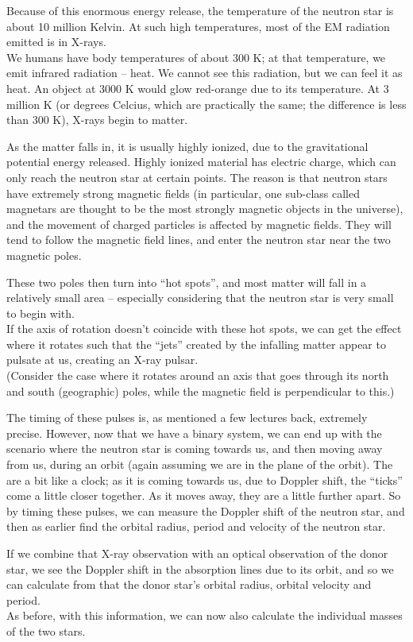 \documentclass[8.01x]{subfiles}
\begin{document}
Because of this enormous energy release, the temperature of the neutron star is about 10 million Kelvin. At such high temperatures, most of the EM radiation emitted is in X-rays.\\
We humans have body temperatures of about 300 K; at that temperature, we emit infrared radiation -- heat. We cannot see this radiation, but we can feel it as heat. An object at 3000 K would glow red-orange due to its temperature. At 3 million K (or degrees Celcius, which are practically the same; the difference is less than 300 K), X-rays begin to matter.

As the matter falls in, it is usually highly ionized, due to the gravitational potential energy released. Highly ionized material has electric charge, which can only reach the neutron star at certain points. The reason is that neutron stars have extremely strong magnetic fields (in particular, one sub-class called magnetars are thought to be the most strongly magnetic objects in the universe), and the movement of charged particles is affected by magnetic fields. They will tend to follow the magnetic field lines, and enter the neutron star near the two magnetic poles.

These two poles then turn into ``hot spots'', and most matter will fall in a relatively small area -- especially considering that the neutron star is very small to begin with.\\
If the axis of rotation doesn't coincide with these hot spots, we can get the effect where it rotates such that the ``jets'' created by the infalling matter appear to pulsate at us, creating an X-ray pulsar.\\
(Consider the case where it rotates around an axis that goes through its north and south (geographic) poles, while the magnetic field is perpendicular to this.)

The timing of these pulses is, as mentioned a few lectures back, extremely precise. However, now that we have a binary system, we can end up with the scenario where the neutron star is coming towards us, and then moving away from us, during an orbit (again assuming we are in the plane of the orbit). The are a bit like a clock; as it is coming towards us, due to Doppler shift, the ``ticks'' come a little closer together. As it moves away, they are a little further apart. So by timing these pulses, we can measure the Doppler shift of the neutron star, and then as earlier find the orbital radius, period and velocity of the neutron star.

If we combine that X-ray observation with an optical observation of the donor star, we see the Doppler shift in the absorption lines due to its orbit, and so we can calculate from that the donor star's orbital radius, orbital velocity and period.\\
As before, with this information, we can now also calculate the individual masses of the two stars.
\end{document}
